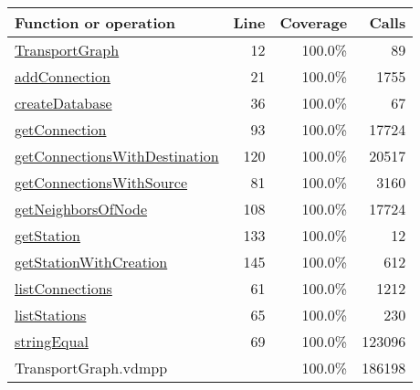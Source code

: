 \bigskip
\begin{longtable}{|l|r|r|r|}
\hline
Function or operation & Line & Coverage & Calls \\
\hline
\hline
\hyperref[TransportGraph:12]{TransportGraph} & 12&100.0\% & 89 \\
\hline
\hyperref[addConnection:21]{addConnection} & 21&100.0\% & 1755 \\
\hline
\hyperref[createDatabase:36]{createDatabase} & 36&100.0\% & 67 \\
\hline
\hyperref[getConnection:93]{getConnection} & 93&100.0\% & 17724 \\
\hline
\hyperref[getConnectionsWithDestination:120]{getConnectionsWithDestination} & 120&100.0\% & 20517 \\
\hline
\hyperref[getConnectionsWithSource:81]{getConnectionsWithSource} & 81&100.0\% & 3160 \\
\hline
\hyperref[getNeighborsOfNode:108]{getNeighborsOfNode} & 108&100.0\% & 17724 \\
\hline
\hyperref[getStation:133]{getStation} & 133&100.0\% & 12 \\
\hline
\hyperref[getStationWithCreation:145]{getStationWithCreation} & 145&100.0\% & 612 \\
\hline
\hyperref[listConnections:61]{listConnections} & 61&100.0\% & 1212 \\
\hline
\hyperref[listStations:65]{listStations} & 65&100.0\% & 230 \\
\hline
\hyperref[stringEqual:69]{stringEqual} & 69&100.0\% & 123096 \\
\hline
\hline
TransportGraph.vdmpp & & 100.0\% & 186198 \\
\hline
\end{longtable}

